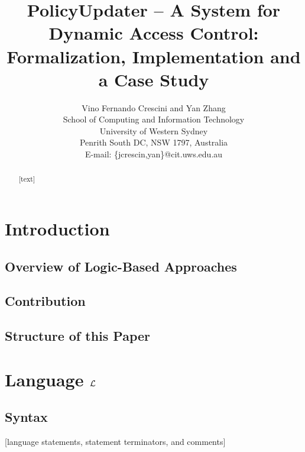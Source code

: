 \documentclass[10pt, twocolumn]{article}
\begin{document}
  \title{
    PolicyUpdater -- A System for Dynamic Access Control:  \\
    Formalization, Implementation and a Case Study
  }

  \author{
    Vino Fernando Crescini and Yan Zhang                   \\
    School of Computing and Information Technology         \\
    University of Western Sydney                           \\
    Penrith South DC, NSW 1797, Australia                  \\
    E-mail: \{jcrescin,yan\}@cit.uws.edu.au
  }

  \date{}

  \maketitle

  \begin{abstract}
    [text]
  \end{abstract}

  \section{Introduction}

    \subsection{Overview of Logic-Based Approaches}

    \subsection{Contribution}

    \subsection{Structure of this Paper}

  \section{Language $\cal{L}$}

    \subsection{Syntax}

      [language statements, statement terminators, and comments]
\end{document}

